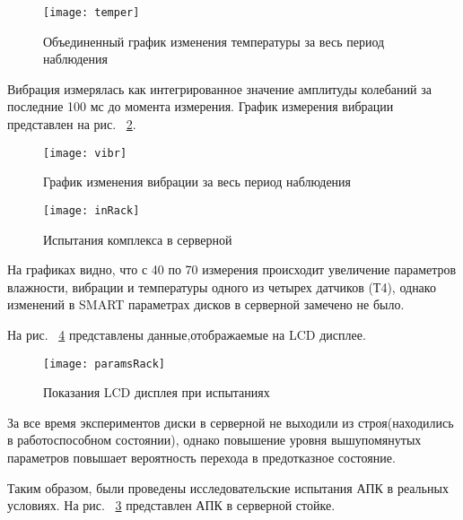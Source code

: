 \begin{figure}[H]
	\centering
	\texttt{[image: temper]}
	\caption{Объединенный график изменения температуры за весь период наблюдения}
	\label{fig:temper}
\end{figure}
Вибрация  измерялась  как  интегрированное  значение  амплитуды колебаний за последние 100 мс до момента измерения. График измерения вибрации представлен на рис.  ~\ref{fig:vibr}.

\begin{figure}[!h]
	\centering
	\texttt{[image: vibr]}
	\caption{График изменения вибрации за весь период наблюдения}
	\label{fig:vibr}
\end{figure}

\begin{figure}[!h]
	\centering
	\texttt{[image: inRack]}
	\caption{Испытания комплекса в серверной}
	\label{fig:inRack}
\end{figure}

На графиках видно, что с 40 по 70 измерения происходит увеличение параметров влажности, вибрации и температуры одного из четырех датчиков (Т4), однако изменений в SMART параметрах дисков в серверной замечено не было.


На рис. ~\ref{fig:paramsRack} представлены данные,отображаемые на LCD дисплее.

\begin{figure}[!h]
	\centering
	\texttt{[image: paramsRack]}
	\caption{Показания LCD дисплея при испытаниях}
	\label{fig:paramsRack}
\end{figure}
За все время экспериментов диски в серверной не выходили из строя(находились в работоспособном состоянии), однако повышение уровня  вышупомянутых параметров повышает вероятность перехода в предотказное состояние. 

Таким образом, были проведены исследовательские испытания АПК в реальных условиях. На рис. ~\ref{fig:inRack} представлен АПК в серверной стойке.